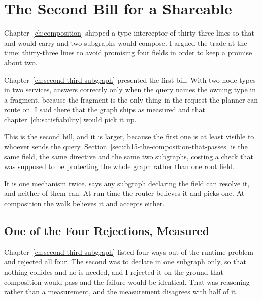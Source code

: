 \section{The Second Bill for a Shareable }
\label{sec:ch15-the-second-bill-for-a-shareable-node}

%
Chapter~\ref{ch:composition} shipped a type interceptor of thirty-three lines
so that  and  would carry  and two
subgraphs would compose. I argued the trade at the time: thirty-three lines to
avoid promising four fields in order to keep a promise about two.

%
Chapter~\ref{ch:second-third-subgraph} presented the first bill. With two node
types in two services,  answers correctly only when the query
names the owning type in a fragment, because the fragment is the only thing in
the request the planner can route on. I said there that the graph ships as
measured and that chapter~\ref{ch:satisfiability} would pick it up.

%
This is the second bill, and it is larger, because the first one is at least
visible to whoever sends the query.
Section~\ref{sec:ch15-the-composition-that-passes} is the same field, the same
directive and the same two subgraphs, costing a check that was supposed to be
protecting the whole graph rather than one root field.

%
It is one mechanism twice.  says any subgraph declaring the
field can resolve it, and neither of them can. At run time the router believes
it and picks one. At composition the walk believes it and accepts either.

\subsection{One of the Four Rejections, Measured}

%
Chapter~\ref{ch:second-third-subgraph} listed four ways out of the runtime
problem and rejected all four. The second was to declare  in one
subgraph only, so that nothing collides and no  is needed, and
I rejected it on the ground that composition would pass and the failure would
be identical. That was reasoning rather than a measurement, and the
measurement disagrees with half of it.

